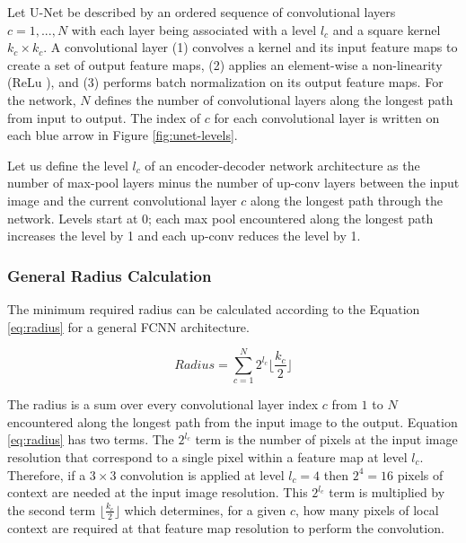 \documentclass[letterpaper]{article} %
\begin{document}
Let U-Net be described by an ordered sequence of convolutional layers $c={1, ..., N}$ with each layer being associated with a level $l_{c}$ and a square kernel $k_{c} \times k_{c}$. 
A convolutional layer (1) convolves a kernel and its input feature maps to create a set of output feature maps, (2) applies an element-wise a non-linearity (ReLu \cite{lecun2015deep}), and (3) performs batch normalization \cite{ioffe2015batch} on its output feature maps.
For the network, $N$ defines the number of convolutional layers along the longest path from input to output. The index of $c$ for each convolutional layer is written on each blue arrow in Figure \ref{fig:unet-levels}.

Let us define the level $l_{c}$ of an encoder-decoder network architecture as the number of max-pool layers minus the number of up-conv layers between the input image and the current convolutional layer $c$ along the longest path through the network. Levels start at 0; each max pool encountered along the longest path increases the level by 1 and each up-conv reduces the level by 1. 


\subsubsection{General Radius Calculation}
The minimum required radius can be calculated according to the Equation \ref{eq:radius} for a general FCNN architecture. 

\begin{equation}
Radius = \sum_{c=1}^{N} 2^{l_c} \lfloor \frac{k_c}{2} \rfloor
\label{eq:radius}
\end{equation}

The radius is a sum over every convolutional layer index $c$ from $1$ to $N$ encountered along the longest path from the input image to the output.
Equation \ref{eq:radius} has two terms. The $2^{l_c}$ term is the number of pixels at the input image resolution that correspond to a single pixel within a feature map at level $l_c$. Therefore, if a $3 \times 3$ convolution is applied at level $l_c=4$ then $2^4 = 16$ pixels of context are needed at the input image resolution. This $2^{l_c}$ term is multiplied by the second term $\lfloor \frac{k_c}{2} \rfloor$ which determines, for a given $c$, how many pixels of local context are required at that feature map resolution to perform the convolution.
\end{document}
